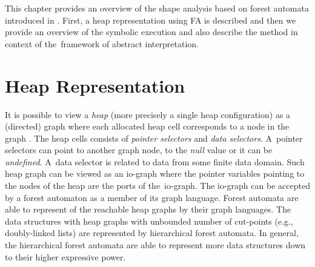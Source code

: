 This chapter provides an overview of the shape analysis based on forest automata introduced in \cite{forester12}.
First, a heap representation using FA is described and then
we provide an overview of the symbolic execution and
also describe the method in context of the~framework of abstract interpretation.

\section{Heap Representation}
\label{sec:hd}

It is possible to view a \emph{heap} (more precisely a single heap configuration)
as a (directed) graph where each allocated heap cell corresponds to a node in the graph \cite{forester13}.
The heap cells consists of \emph{pointer selectors} and \emph{data selectors}.
A~pointer selectors can point to another graph node, to the \emph{null} value or it can be \emph{undefined}.
A~data selector is related to data from some finite data domain.
Such heap graph can be viewed as an io-graph where
the pointer variables pointing to the nodes of the heap are the ports of the~io-graph.
The io-graph can be accepted by a forest automaton as
a member of its graph language.
Forest automata are able to represent of the reachable heap graphs
by their graph languages.
The data structures with heap graphs with unbounded number of cut-points
(e.g., doubly-linked lists) are represented by hierarchical forest automata.
In general, the hierarchical forest automata are able to represent more
data structures down to their higher expressive power.




